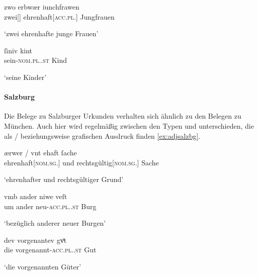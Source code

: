 \begin{exe}
\ex \label{ex:adjmuench}
	\begin{xlist}
	\ex \label{ex:adjmuench_1}
		\gll zwo erbwær iunchfrawen \\
			zwei[\FemF] ehrenhaft[\textsc{acc.pl.\FemF}] Jungfrauen \\
		\begin{taggedline}{\parencites(München, 1288)[\pno~1024, 348.21]{cao2}}
		\trans `zwei ehrenhafte junge Frauen'
		\end{taggedline}

	\ex \label{ex:adjmuench_2}
		\gll ſiniv kint \\
			sein-\textsc{nom.pl.\NeutA.st} Kind \\
		\begin{taggedline}{\parencites(München, 1296)[\pno~2371, 473.9]{cao3}}
		\trans `seine Kinder'
		\end{taggedline}
	\end{xlist}
\end{exe}

\paragraph{Salzburg}
\label{par:adjsalzburg}
Die Belege zu Salzburger Urkunden verhalten sich ähnlich zu den Belegen zu
München. Auch hier wird regelmäßig zwischen den Typen  und
 unterschieden, die als / beziehungsweise 
grafischen Ausdruck finden \cref{ex:adjsalzbg}.

\begin{exe}
\ex \label{ex:adjsalzbg}
	\begin{xlist}
	\ex \label{ex:adjsalzbg_1}
		\gll ærwer / vnt ehaft ſache \\
			ehrenhaft[\textsc{nom.sg.\FemI}] {} und rechtsgültig[\textsc{nom.sg.\FemI}]
				Sache \\
		\begin{taggedline}{\parencites(Bad Reichenhall, Kr.~Berchtesgadener Land, 1286)[\pno~818, 177.1--2]{cao2}}
		\trans `ehrenhafter und rechtsgültiger Grund'
		\end{taggedline}

	\ex \label{ex:adjsalzbg_2}
		\gll vmb ander niwe veſt \\
			um ander neu-\textsc{acc.pl.\FemI.st} Burg \\
		\begin{taggedline}{\parencites(Salzburg, um 1285)[\pno~695, 104.19]{cao2}}
		\trans `bezüglich anderer neuer Burgen'
		\end{taggedline}

	\ex \label{ex:adjsalzbg_3}
		\gll dev vorgenantev gvͦt \\
			die vorgenannt-\textsc{acc.pl.\FemI.st} Gut \\
		\begin{taggedline}{\parencites(Salzburg, 1296)[\pno~2446, 514.11--12]{cao3}}
		\trans `die vorgenannten Güter'
		\end{taggedline}
	\end{xlist}
\end{exe}

